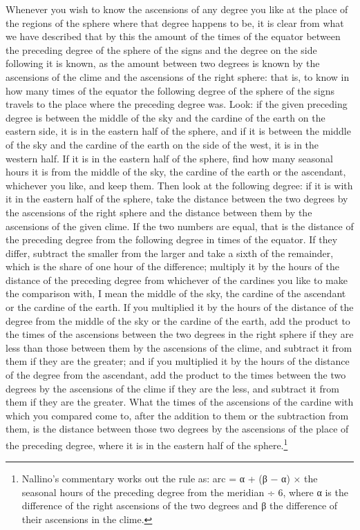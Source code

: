\documentclass[11pt]{article}
\newcommand{\ArPage}[1]{\marginpar{\footnotesize\color{gray}Ar.\,p.\,#1}}
\begin{document}
\par \ArPage{201}Whenever you wish to know the ascensions of any degree you like at the place of the regions of the sphere where that degree happens to be, it is clear from what we have described that by this the amount of the times of the equator between the preceding degree of the sphere of the signs and the degree on the side following it is known, as the amount between two degrees is known by the ascensions of the clime and the ascensions of the right sphere: that is, to know in how many times of the equator the following degree of the sphere of the signs travels to the place where the preceding degree was. Look: if the given preceding degree is between the middle of the sky and the cardine of the earth on the eastern side, it is in the eastern half of the sphere, and if it is between the middle of the sky and the cardine of the earth on the side of the west, it is in the western half. If it is in the eastern half of the sphere, find how many seasonal hours it is from the middle of the sky, the cardine of the earth or the ascendant, whichever you like, and keep them. Then look at the following degree: if it is with it in the eastern half of the sphere, take the distance between the two degrees by the ascensions of the right sphere and the distance between them by the ascensions of the given clime. If the two numbers are equal, that is the distance of the preceding degree from the following degree in times of the equator. If they differ, subtract the smaller from the larger and take a sixth of the remainder, which is the share of one hour of the difference; multiply it by the hours of the distance of the preceding degree from whichever of the cardines you like to make the comparison with, I mean the middle of the sky, the cardine of the ascendant or the cardine of the earth. If you multiplied it by the hours of the distance of the degree from the middle of the sky or the cardine of the earth, add the product to the times of the ascensions between the two degrees in the right sphere if they are less than those between them by the ascensions of the clime, and subtract it from them if they are the greater; and if you multiplied it by the hours of the distance of the degree from the ascendant, add the product to the times between the two degrees by the ascensions of the clime if they are the less, and subtract it from them if they are the greater. What the times of the ascensions of the cardine with which you compared come to, after the addition to them or the subtraction from them, is the distance between those two degrees by the ascensions of the place of the preceding degree, where it is in the eastern half of the sphere.\footnote{Nallino's commentary works out the rule as: arc = α + (β − α) × the seasonal hours of the preceding degree from the meridian ÷ 6, where α is the difference of the right ascensions of the two degrees and β the difference of their ascensions in the clime.}\par
\end{document}
